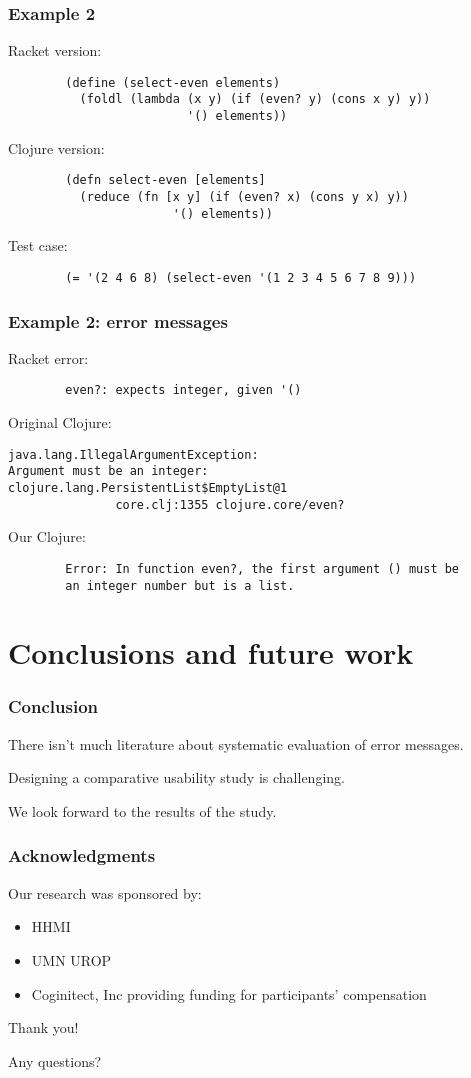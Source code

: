 \documentclass{beamer}
\begin{document}
\begin{frame}[fragile]
\frametitle{Example 2}
Racket version:
\begin{verbatim}
		(define (select-even elements) 
		  (foldl (lambda (x y) (if (even? y) (cons x y) y)) 
                         '() elements))
\end{verbatim}
Clojure version:  
\begin{verbatim}
		(defn select-even [elements] 
		  (reduce (fn [x y] (if (even? x) (cons y x) y))  
                       '() elements))
\end{verbatim}
Test case:
\begin{verbatim}
		(= '(2 4 6 8) (select-even '(1 2 3 4 5 6 7 8 9)))
\end{verbatim}
\end{frame}


\begin{frame}[fragile]
\frametitle{Example 2: error messages}
Racket error:
\begin{verbatim}
		even?: expects integer, given '()
\end{verbatim}

Original Clojure:
\begin{verbatim}
java.lang.IllegalArgumentException: 
Argument must be an integer: 
clojure.lang.PersistentList$EmptyList@1
               core.clj:1355 clojure.core/even?	
\end{verbatim}

Our Clojure: 
\begin{verbatim}
		Error: In function even?, the first argument () must be
		an integer number but is a list.
\end{verbatim}
\end{frame}



\section{Conclusions and future work} 

\begin{frame}
\frametitle{Conclusion}
There isn't much literature about systematic evaluation of error messages.

Designing a comparative usability study is challenging.

We look forward to the results of the study.  

\end{frame}

\begin{frame}
\frametitle{Acknowledgments}
	Our research was sponsored by:
	\begin{itemize}
	\item HHMI
	\item UMN UROP
          \item Coginitect, Inc providing funding for participants' compensation 
	\end{itemize}
	
	
	{\centering
	\noindent
	Thank you! \par
	Any questions? \par
	}
\end{frame}
\end{document}
